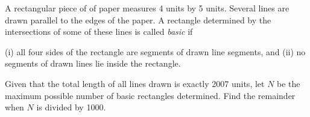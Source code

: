 A rectangular piece of of paper measures 4 units by 5 units. Several lines are drawn parallel to the edges of the paper. A rectangle determined by the intersections of some of these lines is called \textit{basic }if

(i) all four sides of the rectangle are segments of drawn line segments, and
(ii) no segments of drawn lines lie inside the rectangle.

Given that the total length of all lines drawn is exactly 2007 units, let $N$ be the maximum possible number of basic rectangles determined. Find the remainder when $N$ is divided by 1000.
